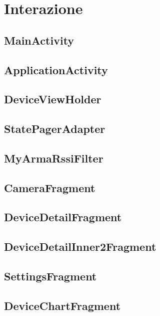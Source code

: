 \chapter{Interazione}

\section{MainActivity}


\newpage
\section{ApplicationActivity}




\newpage


\newpage
\section{DeviceViewHolder}



\newpage
\section{StatePagerAdapter}


\newpage
\section{MyArmaRssiFilter}



\newpage
\section{CameraFragment}


\newpage
\section{DeviceDetailFragment}


\newpage
\section{DeviceDetailInner2Fragment}


\newpage
\section{SettingsFragment}


\newpage
\section{DeviceChartFragment}


